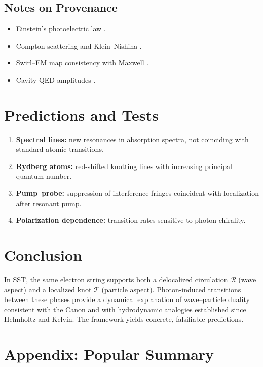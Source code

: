 \documentclass[11pt,a4paper]{article}
\begin{document}
    \subsection{Notes on Provenance}
    \begin{itemize}
    \item Einstein’s photoelectric law \cite{Einstein1905,Millikan1916}.
    \item Compton scattering and Klein--Nishina \cite{Compton1923,KleinNishina1929}.
    \item Swirl--EM map consistency with Maxwell \cite{Jackson1999}.
    \item Cavity QED amplitudes \cite{HarocheRaimond2006,ScullyZubairy1997}.
    \end{itemize}



    \section{Predictions and Tests}

    \begin{enumerate}
    \item \textbf{Spectral lines:} new resonances in absorption spectra, not coinciding with standard atomic transitions.
    \item \textbf{Rydberg atoms:} red-shifted knotting lines with increasing principal quantum number.
    \item \textbf{Pump--probe:} suppression of interference fringes coincident with localization after resonant pump.
    \item \textbf{Polarization dependence:} transition rates sensitive to photon chirality.
    \end{enumerate}

    \section{Conclusion}

    In SST, the same electron string supports both a delocalized circulation $\mathcal R$ (wave aspect) and a localized knot $\mathcal T$ (particle aspect). Photon-induced transitions between these phases provide a dynamical explanation of wave--particle duality consistent with the Canon and with hydrodynamic analogies established since Helmholtz and Kelvin. The framework yields concrete, falsifiable predictions.

\appendix
\section*{Appendix: Popular Summary}
\end{document}
